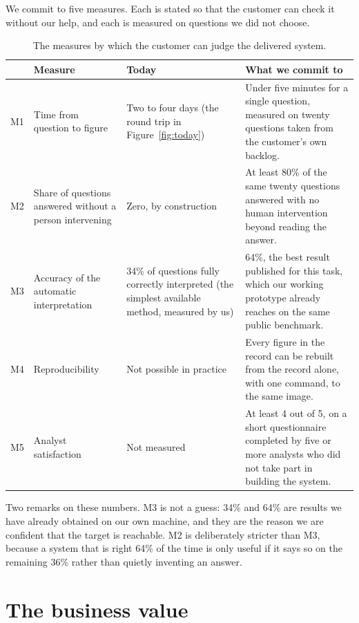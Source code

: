 \documentclass[12pt,a4paper]{report}
\begin{document}
We commit to five measures. Each is stated so that the customer can check it
without our help, and each is measured on questions we did not choose.

\begin{table}[H]
  \centering
  \caption{The measures by which the customer can judge the delivered system.}
  \label{tab:metrics}
  \begin{tabular}{@{}p{0.9cm}p{4.4cm}p{4.3cm}p{5.0cm}@{}}
    \toprule[1.5pt]
    & \textbf{Measure} & \textbf{Today} & \textbf{What we commit to} \\
    \midrule
    M1 & Time from question to figure &
      Two to four days (the round trip in Figure~\ref{fig:today}) &
      Under five minutes for a single question, measured on twenty questions
      taken from the customer's own backlog. \\
    \addlinespace
    M2 & Share of questions answered without a person intervening &
      Zero, by construction &
      At least 80\% of the same twenty questions answered with no human
      intervention beyond reading the answer. \\
    \addlinespace
    M3 & Accuracy of the automatic interpretation &
      34\% of questions fully correctly interpreted (the simplest available
      method, measured by us) &
      64\%, the best result published for this task, which our working
      prototype already reaches on the same public benchmark. \\
    \addlinespace
    M4 & Reproducibility &
      Not possible in practice &
      Every figure in the record can be rebuilt from the record alone, with one
      command, to the same image. \\
    \addlinespace
    M5 & Analyst satisfaction &
      Not measured &
      At least 4 out of 5, on a short questionnaire completed by five or more
      analysts who did not take part in building the system. \\
    \bottomrule[1.5pt]
  \end{tabular}
\end{table}

Two remarks on these numbers. M3 is not a guess: 34\% and 64\% are results we
have already obtained on our own machine, and they are the reason we are
confident that the target is reachable. M2 is deliberately stricter than M3,
because a system that is right 64\% of the time is only useful if it says so on
the remaining 36\% rather than quietly inventing an answer.

\section{The business value}
\end{document}
